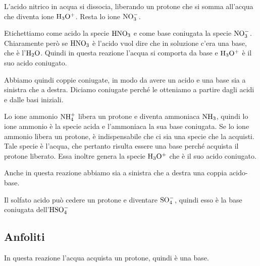 \vspace{0.2cm}L'acido nitrico in acqua si dissocia, liberando un protone che si somma all'acqua che diventa ione $\rm H_3O^+$. Resta lo ione $\rm NO_3^-$.

Etichettiamo come acido la specie $\rm HNO_3$ e come base coniugata la specie $\rm NO_3^-$. Chiaramente però se $\rm HNO_3$ è l'acido vuol dire che in soluzione c'era una base, che è l'$\rm H_2O$. Quindi in questa reazione l'acqua si comporta da base e $\rm H_3O^+$ è il suo acido coniugato.

Abbiamo quindi coppie coniugate, in modo da avere un acido e una base sia a sinistra che a destra. Diciamo coniugate perché le otteniamo a partire dagli acidi e dalle basi iniziali.

\vspace{0.2cm}

\vspace{0.2cm}Lo ione ammonio $\rm NH_4^+$ libera un protone e diventa ammoniaca $\rm NH_3$, quindi lo ione ammonio è la specie acida e l'ammoniaca la sua base coniugata. Se lo ione ammonio libera un protone, è indispensabile che ci sia una specie che la acquisti. Tale specie è l'acqua, che pertanto risulta essere una base perché acquista il protone liberato. Essa inoltre genera la specie $\rm H_3O^+$ che è il suo acido coniugato.

Anche in questa reazione abbiamo sia a sinistra che a destra una coppia acido-base.

\vspace{0.2cm}

\vspace{0.2cm}Il solfato acido può cedere un protone e diventare $\rm SO_4^-$, quindi esso è la base coniugata dell'$\rm HSO_4^-$

\vspace{0.2cm}


\subsection{Anfoliti}


\vspace{0.2cm}In questa reazione l'acqua acquista un protone, quindi è una base.

\vspace{0.2cm}

